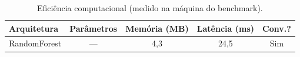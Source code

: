 \begin{table}[H]
\centering
\caption{Eficiência computacional (medido na máquina do benchmark).}
\label{tab:bench_eficiencia}
\small\singlespacing
\begin{tabular}{lcccc}
\toprule
\textbf{Arquitetura} & \textbf{Parâmetros} & \textbf{Memória (MB)} & \textbf{Latência (ms)} & \textbf{Conv.?} \\
\midrule
RandomForest & --- & 4,3 & 24,5 & \textcolor{successgreen}{Sim} \\
\bottomrule
\end{tabular}
\end{table}

